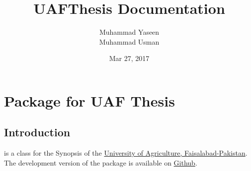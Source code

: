 \documentclass[letterpaper,10pt,english]{sphinxmanual}
\title{UAFThesis Documentation}
\date{Mar 27, 2017}
\author{Muhammad Yaseen\\Muhammad Usman}
\begin{document}
\maketitle
\sphinxtableofcontents
{}\label{\detokenize{index::doc}}



\chapter{ Package for UAF Thesis}
\label{\detokenize{index:latex-package-for-uaf-thesis}}\label{\detokenize{index:uafthesis-s-documentation}}

\section{Introduction}
\label{\detokenize{index:introduction}}
 is a   class for the Synopsis of the \href{https://uaf.edu.pk}{University of Agriculture, Faisalabad-Pakistan}. The development version of the package is available on \href{https://github.com/MYaseen208/UAFThesis}{Github}.
\end{document}
